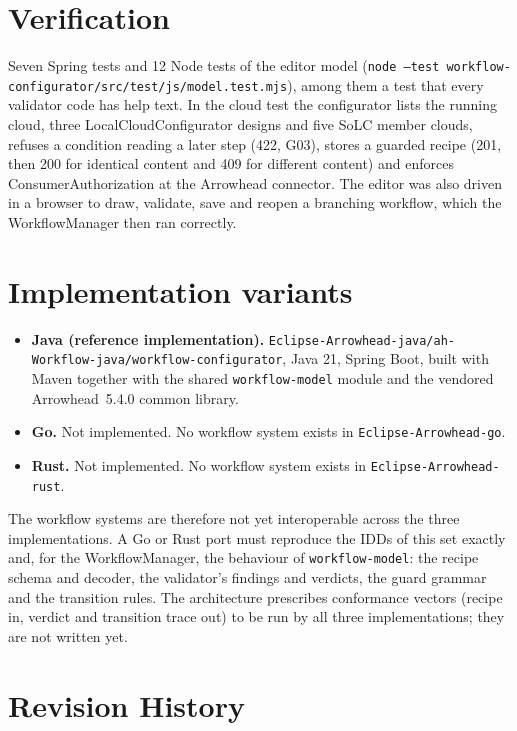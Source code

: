 \documentclass[a4paper]{arrowhead}
\begin{document}
\section{Verification}
\label{sec:verification}
Seven Spring tests and 12 Node tests of the editor model (\texttt{node --test
workflow-configurator/src/test/js/model.test.mjs}), among them a test that every validator code has help text. In the
cloud test the configurator lists the running cloud, three LocalCloudConfigurator designs and five SoLC member clouds,
refuses a condition reading a later step (422, G03), stores a guarded recipe (201, then 200 for identical content and
409 for different content) and enforces ConsumerAuthorization at the Arrowhead connector. The editor was also driven in
a browser to draw, validate, save and reopen a branching workflow, which the WorkflowManager then ran correctly.


\section{Implementation variants}
\label{sec:variants}
\begin{itemize}
\item \textbf{Java (reference implementation).} \texttt{Eclipse-Arrowhead-java/ah-Workflow-java/workflow-configurator}, Java 21, Spring
Boot, built with Maven together with the shared \texttt{workflow-model} module and the vendored Arrowhead~5.4.0 common
library.
\item \textbf{Go.} Not implemented. No workflow system exists in \texttt{Eclipse-Arrowhead-go}.
\item \textbf{Rust.} Not implemented. No workflow system exists in \texttt{Eclipse-Arrowhead-rust}.
\end{itemize}
The workflow systems are therefore not yet interoperable across the three implementations. A Go or Rust port must
reproduce the IDDs of this set exactly and, for the WorkflowManager, the behaviour of \texttt{workflow-model}: the
recipe schema and decoder, the validator's findings and verdicts, the guard grammar and the transition rules. The
architecture prescribes conformance vectors (recipe in, verdict and transition trace out) to be run by all three
implementations; they are not written yet.


\newpage



\newpage

\section{Revision History}
\end{document}
